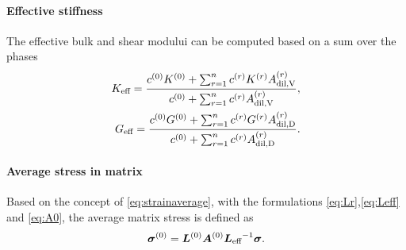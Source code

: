 \paragraph{Effective stiffness}
The effective bulk and shear modului can be computed based on a sum over the phases
\begin{align}
K_{\text{eff}} = \dfrac{c^{(0)}K^{(0)} + \sum^{n}_{r=1} c^{(r)} K^{(r)} A^{(r)}_{\text{dil,V}}}{c^{(0)} + \sum^{n}_{r=1} c^{(r)} A^{(r)}_{\text{dil,V}}},\label{eq:keff} \\
G_{\text{eff}} = \dfrac{c^{(0)}G^{(0)} + \sum^{n}_{r=1} c^{(r)} G^{(r)} A^{(r)}_{\text{dil,D}}}{c^{(0)} + \sum^{n}_{r=1} c^{(r)} A^{(r)}_{\text{dil,D}}}.\label{eq:geff}
\end{align}
\paragraph{Average stress in matrix}
Based on the concept of \eqref{eq:strainaverage}, with the formulations \eqref{eq:Lr},\eqref{eq:Leff} and \eqref{eq:A0}, the average matrix stress is defined as 
\begin{align}
\boldsymbol{\sigma}^{(0)} = \boldsymbol{L}^{(0)}\boldsymbol{A}^{(0)} {\boldsymbol{L}_{\text{eff}}}^{-1}\boldsymbol{\sigma}. \label{eq:matrixstress}
\end{align}


